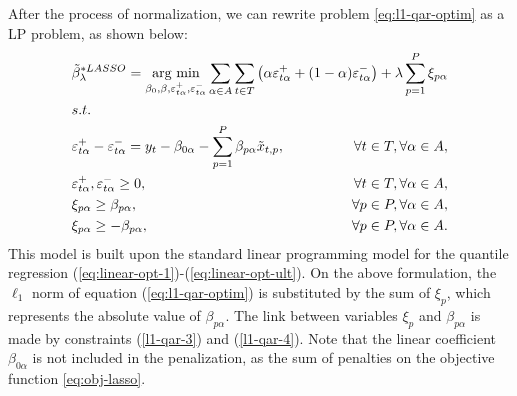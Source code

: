 After the process of normalization, we can rewrite problem \ref{eq:l1-qar-optim} as a LP problem, as shown below:
\begin{align}
&\tilde \beta_\lambda^{*LASSO} = \underset{\beta_{0},\beta,\varepsilon_{t \alpha}^{+},\varepsilon_{t \alpha}^{-}}{\text{arg min}} \sum_{\alpha \in A} \sum_{t \in T}\left(\alpha\varepsilon_{t \alpha}^{+}+(1-\alpha)\varepsilon_{t \alpha}^{-}\right)+\lambda\sum_{p=1}^{P}\mbox{\ensuremath{\xi}}_{p \alpha} \span \label{eq:obj-lasso} \\
&\mbox{s.t. }  & \\
&\varepsilon_{t \alpha}^{+}-\varepsilon_{t \alpha}^{-}= y_{t}-\beta_{0 \alpha}-\sum_{p=1}^{P}\beta_{p \alpha}\tilde x_{t,p},&\forall t\in T, \forall \alpha \in A, \\
&\varepsilon_{t \alpha}^{+},\varepsilon_{t \alpha}^{-}\geq0,&\forall t \in T, \forall \alpha \in A,\\
&\xi_{p\alpha}\geq\beta_{p \alpha},&\forall p\in P, \forall \alpha \in A,  \label{l1-qar-3}
\\
&\xi_{p\alpha}\geq-\beta_{p \alpha},&\forall p\in P, \forall \alpha \in A.  \label{l1-qar-4}
\end{align}
This model is built upon the standard linear programming model for the quantile regression (\ref{eq:linear-opt-1})-(\ref{eq:linear-opt-ult}). 
On the above formulation, the $\ell_1$ norm of equation (\ref{eq:l1-qar-optim}) is substituted by the sum of $\xi_p$, which represents the absolute value of $\beta_{p\alpha}$. The link between variables $\xi_p$ and $\beta_{p\alpha}$ is made by constraints (\ref{l1-qar-3}) and (\ref{l1-qar-4}). Note that the linear coefficient $\beta_{0\alpha}$ is not included in the penalization, as the sum of penalties on the objective function \ref{eq:obj-lasso}.

